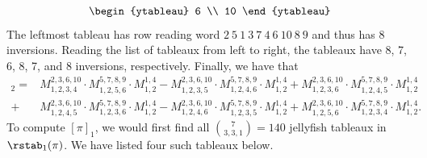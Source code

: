\begin{example}
\[\begin{ytableau}
6 \\
10
\end{ytableau}\]
The leftmost tableau has row reading word $2~5~1~3~7~4~6~10~8~9$ and thus has 8 inversions. Reading the list of tableaux from left to right, the tableaux have 8, 7, 6, 8, 7, and 8 inversions, respectively. Finally, we have that 
{\small 
\begin{align*}[\pi]_2 = &M_{1,2,3,4}^{2,3,6,10}\cdot M_{1,2,5,6}^{5,7,8,9}\cdot M_{1,2}^{1,4}
- M_{1,2,3,5}^{2,3,6,10}\cdot M_{1,2,4,6}^{5,7,8,9}\cdot M_{1,2}^{1,4}
+ M_{1,2,3,6}^{2,3,6,10}\cdot M_{1,2,4,5}^{5,7,8,9}\cdot M_{1,2}^{1,4}\\
+ &M_{1,2,4,5}^{2,3,6,10}\cdot M_{1,2,3,6}^{5,7,8,9}\cdot M_{1,2}^{1,4}
- M_{1,2,4,6}^{2,3,6,10}\cdot M_{1,2,3,5}^{5,7,8,9}\cdot M_{1,2}^{1,4}
+ M_{1,2,5,6}^{2,3,6,10}\cdot M_{1,2,3,4}^{5,7,8,9}\cdot M_{1,2}^{1,4}.
\end{align*}
}
To compute $[\pi]_1$, we would first find all $\binom{7}{3,3,1}=140$ jellyfish tableaux in $\rstab_1(\pi)$. We have listed four such tableaux below. 



\end{example}
